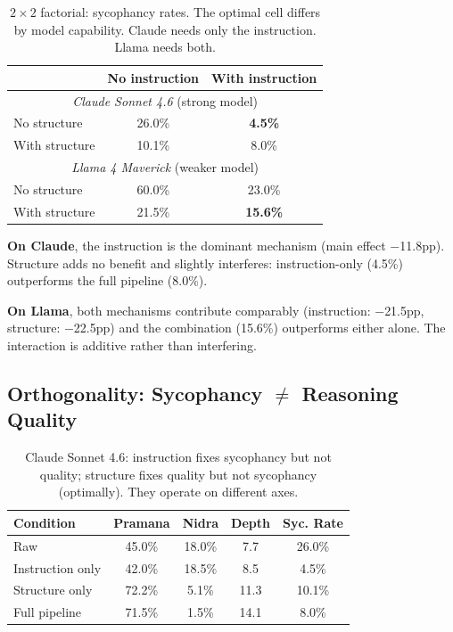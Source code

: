 \documentclass[11pt]{article}
\begin{document}
\begin{table}[h]
\centering
\small
\begin{tabular}{lcc}
\toprule
& \textbf{No instruction} & \textbf{With instruction} \\
\midrule
\multicolumn{3}{c}{\textit{Claude Sonnet 4.6} (strong model)} \\
\midrule
No structure & 26.0\% & \textcolor{fixgreen}{\textbf{4.5\%}} \\
With structure & 10.1\% & 8.0\% \\
\midrule
\multicolumn{3}{c}{\textit{Llama 4 Maverick} (weaker model)} \\
\midrule
No structure & 60.0\% & 23.0\% \\
With structure & 21.5\% & \textcolor{fixgreen}{\textbf{15.6\%}} \\
\bottomrule
\end{tabular}
\caption{$2 \times 2$ factorial: sycophancy rates. The optimal cell differs by model capability. Claude needs only the instruction. Llama needs both.}
\label{tab:factorial}
\end{table}

\textbf{On Claude}, the instruction is the dominant mechanism (main effect $-$11.8pp). Structure adds no benefit and slightly interferes: instruction-only (4.5\%) outperforms the full pipeline (8.0\%).

\textbf{On Llama}, both mechanisms contribute comparably (instruction: $-$21.5pp, structure: $-$22.5pp) and the combination (15.6\%) outperforms either alone. The interaction is additive rather than interfering.

\subsection{Orthogonality: Sycophancy $\neq$ Reasoning Quality}

\begin{table}[h]
\centering
\small
\begin{tabular}{lcccc}
\toprule
\textbf{Condition} & \textbf{Pramana} & \textbf{Nidra} & \textbf{Depth} & \textbf{Syc. Rate} \\
\midrule
Raw & 45.0\% & 18.0\% & 7.7 & 26.0\% \\
Instruction only & 42.0\% & 18.5\% & 8.5 & \textcolor{fixgreen}{4.5\%} \\
Structure only & \textcolor{fixgreen}{72.2\%} & \textcolor{fixgreen}{5.1\%} & \textcolor{fixgreen}{11.3} & 10.1\% \\
Full pipeline & 71.5\% & 1.5\% & 14.1 & 8.0\% \\
\bottomrule
\end{tabular}
\caption{Claude Sonnet 4.6: instruction fixes sycophancy but not quality; structure fixes quality but not sycophancy (optimally). They operate on different axes.}
\label{tab:orthogonality}
\end{table}
\end{document}
